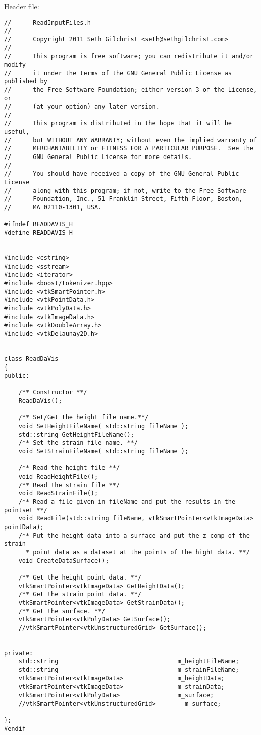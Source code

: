 Header file:
\begin{lstlisting}
//      ReadInputFiles.h
//
//      Copyright 2011 Seth Gilchrist <seth@sethgilchrist.com>
//
//      This program is free software; you can redistribute it and/or modify
//      it under the terms of the GNU General Public License as published by
//      the Free Software Foundation; either version 3 of the License, or
//      (at your option) any later version.
//
//      This program is distributed in the hope that it will be useful,
//      but WITHOUT ANY WARRANTY; without even the implied warranty of
//      MERCHANTABILITY or FITNESS FOR A PARTICULAR PURPOSE.  See the
//      GNU General Public License for more details.
//
//      You should have received a copy of the GNU General Public License
//      along with this program; if not, write to the Free Software
//      Foundation, Inc., 51 Franklin Street, Fifth Floor, Boston,
//      MA 02110-1301, USA.

#ifndef READDAVIS_H
#define READDAVIS_H


#include <cstring>
#include <sstream>
#include <iterator>
#include <boost/tokenizer.hpp>
#include <vtkSmartPointer.h>
#include <vtkPointData.h>
#include <vtkPolyData.h>
#include <vtkImageData.h>
#include <vtkDoubleArray.h>
#include <vtkDelaunay2D.h>


class ReadDaVis
{
public:

    /** Constructor **/
    ReadDaVis();

    /** Set/Get the height file name.**/
    void SetHeightFileName( std::string fileName );
    std::string GetHeightFileName();
    /** Set the strain file name. **/
    void SetStrainFileName( std::string fileName );

    /** Read the height file **/
    void ReadHeightFile();
    /** Read the strain file **/
    void ReadStrainFile();
    /** Read a file given in fileName and put the results in the pointset **/
    void ReadFile(std::string fileName, vtkSmartPointer<vtkImageData> pointData);
    /** Put the height data into a surface and put the z-comp of the strain
      * point data as a dataset at the points of the hight data. **/
    void CreateDataSurface();

    /** Get the height point data. **/
    vtkSmartPointer<vtkImageData> GetHeightData();
    /** Get the strain point data. **/
    vtkSmartPointer<vtkImageData> GetStrainData();
    /** Get the surface. **/
    vtkSmartPointer<vtkPolyData> GetSurface();
    //vtkSmartPointer<vtkUnstructuredGrid> GetSurface();


private:
    std::string                                 m_heightFileName;
    std::string                                 m_strainFileName;
    vtkSmartPointer<vtkImageData>               m_heightData;
    vtkSmartPointer<vtkImageData>               m_strainData;
    vtkSmartPointer<vtkPolyData>                m_surface;
    //vtkSmartPointer<vtkUnstructuredGrid>        m_surface;

};
#endif
\end{lstlisting}

